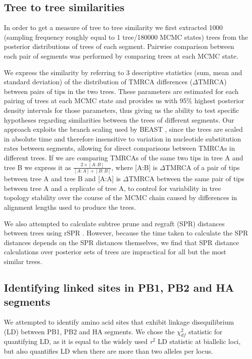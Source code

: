 \documentclass[11pt,oneside,letterpaper]{article}
\begin{document}
\subsection*{Tree to tree similarities}
In order to get a measure of tree to tree similarity we first extracted 1000 (sampling frequency roughly equal to 1 tree/180000 MCMC states) trees from the posterior distributions of trees of each segment.
Pairwise comparison between each pair of segments was performed by comparing trees at each MCMC state.

We express the similarity by referring to 3 descriptive statistics (sum, mean and standard deviation) of the distribution of TMRCA differences ($\Delta$TMRCA) between pairs of tips in the two trees.
These parameters are estimated for each pairing of trees at each MCMC state and provides us with 95\% highest posterior density intervals for those parameters, thus giving us the ability to test specific hypotheses regarding similarities between the trees of different segments.
Our approach exploits the branch scaling used by BEAST \cite{drummond2012}, since the trees are scaled in absolute time and therefore insensitive to variation in nucleotide substitution rates between segments, allowing for direct comparisons between TMRCAs in different trees.
If we are comparing TMRCAs of the same two tips in tree A and tree B we express it as $\frac{2\times [A:B]}{[A:A]+[B:B]}$, where [A:B] is $\Delta$TMRCA of a pair of tips between tree A and tree B and [A:A] is $\Delta$TMRCA between the same pair of tips between tree A and a replicate of tree A, to control for variability in tree topology stability over the course of the MCMC chain caused by differences in alignment lengths used to produce the trees.

We also attempted to calculate subtree prune and regraft (SPR) distances between trees using rSPR \cite{whidden2009,whidden2010,whidden2013}.
However, because the time taken to calculate the SPR distances depends on the SPR distances themselves, we find that SPR distance calculations over posterior sets of trees are impractical for all but the most similar trees.


\subsection*{Identifying linked sites in PB1, PB2 and HA segments}
We attempted to identify amino acid sites that exhibit linkage disequilibrium (LD) between PB1, PB2 and HA segments.
We chose the $\chi^{2}_{df}$ statistic \cite{zhao2005} for quantifying LD, as it is equal to the widely used \textit{r$^{2}$} LD statistic at biallelic loci, but also quantifies LD when there are more than two alleles per locus.
\end{document}
